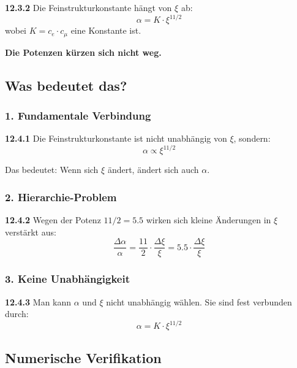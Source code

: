 \begin{tcolorbox}[colback=red!5!white,colframe=red!75!black,title=\textbf{Ergebnis}]
	\noindent \textbf{12.3.2} Die Feinstrukturkonstante hängt von $\xi$ ab:
	\begin{equation}
		\boxed{\alpha = K \cdot \xi^{11/2}}
	\end{equation}
	wobei $K = c_e \cdot c_\mu$ eine Konstante ist.
	
	\textbf{Die Potenzen kürzen sich nicht weg.}
\end{tcolorbox}

\subsection{Was bedeutet das?}

\subsubsection{1. Fundamentale Verbindung}
\noindent \textbf{12.4.1} Die Feinstrukturkonstante ist nicht unabhängig von $\xi$, sondern:
\begin{equation}
	\alpha \propto \xi^{11/2}
\end{equation}

Das bedeutet: Wenn sich $\xi$ ändert, ändert sich auch $\alpha$.

\subsubsection{2. Hierarchie-Problem}
\noindent \textbf{12.4.2} Wegen der Potenz $11/2 = 5.5$ wirken sich kleine Änderungen in $\xi$ verstärkt aus:
\begin{equation}
	\frac{\Delta \alpha}{\alpha} = \frac{11}{2} \cdot \frac{\Delta \xi}{\xi} = 5.5 \cdot \frac{\Delta \xi}{\xi}
\end{equation}

\subsubsection{3. Keine Unabhängigkeit}
\noindent \textbf{12.4.3} Man kann $\alpha$ und $\xi$ nicht unabhängig wählen. Sie sind fest verbunden durch:
\begin{equation}
	\alpha = K \cdot \xi^{11/2}
\end{equation}

\subsection{Numerische Verifikation}

